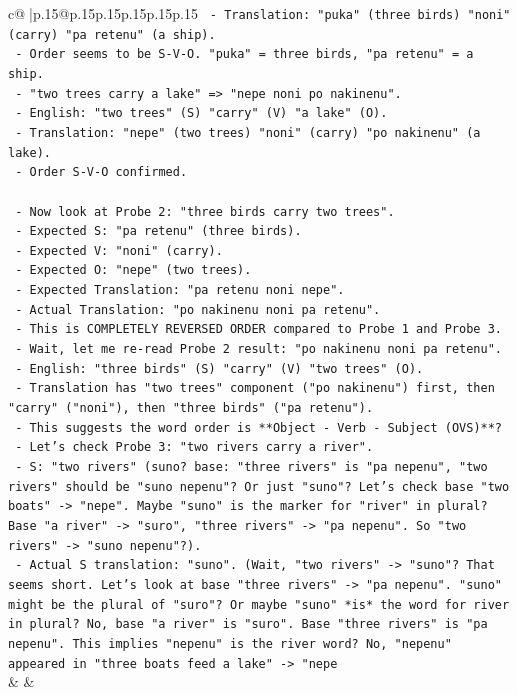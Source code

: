 \documentclass{article}
\begin{document}
{\begin{supertabular}{c@{$\;$}|p{.15\linewidth}@{}p{.15\linewidth}p{.15\linewidth}p{.15\linewidth}p{.15\linewidth}p{.15\linewidth}}
{{{\texttt{     {-} Translation: "puka" (three birds) "noni" (carry) "pa retenu" (a ship).} \\
\texttt{     {-} Order seems to be S{-}V{-}O. "puka" = three birds, "pa retenu" = a ship.} \\
\texttt{   {-} "two trees carry a lake" => "nepe noni po nakinenu".} \\
\texttt{     {-} English: "two trees" (S) "carry" (V) "a lake" (O).} \\
\texttt{     {-} Translation: "nepe" (two trees) "noni" (carry) "po nakinenu" (a lake).} \\
\texttt{     {-} Order S{-}V{-}O confirmed.} \\
\\ 
\texttt{   {-} Now look at Probe 2: "three birds carry two trees".} \\
\texttt{     {-} Expected S: "pa retenu" (three birds).} \\
\texttt{     {-} Expected V: "noni" (carry).} \\
\texttt{     {-} Expected O: "nepe" (two trees).} \\
\texttt{     {-} Expected Translation: "pa retenu noni nepe".} \\
\texttt{     {-} Actual Translation: "po nakinenu noni pa retenu".} \\
\texttt{     {-} This is COMPLETELY REVERSED ORDER compared to Probe 1 and Probe 3.} \\
\texttt{     {-} Wait, let me re{-}read Probe 2 result: "po nakinenu noni pa retenu".} \\
\texttt{     {-} English: "three birds" (S) "carry" (V) "two trees" (O).} \\
\texttt{     {-} Translation has "two trees" component ("po nakinenu") first, then "carry" ("noni"), then "three birds" ("pa retenu").} \\
\texttt{     {-} This suggests the word order is **Object {-} Verb {-} Subject (OVS)**?} \\
\texttt{     {-} Let's check Probe 3: "two rivers carry a river".} \\
\texttt{       {-} S: "two rivers" (suno? base: "three rivers" is "pa nepenu", "two rivers" should be "suno nepenu"? Or just "suno"? Let's check base "two boats" {-}> "nepe". Maybe "suno" is the marker for "river" in plural? Base "a river" {-}> "suro", "three rivers" {-}> "pa nepenu". So "two rivers" {-}> "suno nepenu"?).} \\
\texttt{       {-} Actual S translation: "suno". (Wait, "two rivers" {-}> "suno"? That seems short. Let's look at base "three rivers" {-}> "pa nepenu". "suno" might be the plural of "suro"? Or maybe "suno" *is* the word for river in plural? No, base "a river" is "suro". Base "three rivers" is "pa nepenu". This implies "nepenu" is the river word? No, "nepenu" appeared in "three boats feed a lake" {-}> "nepe} \\
            }
        }
    }
    & & \\ \\


\end{supertabular}}
\end{document}
